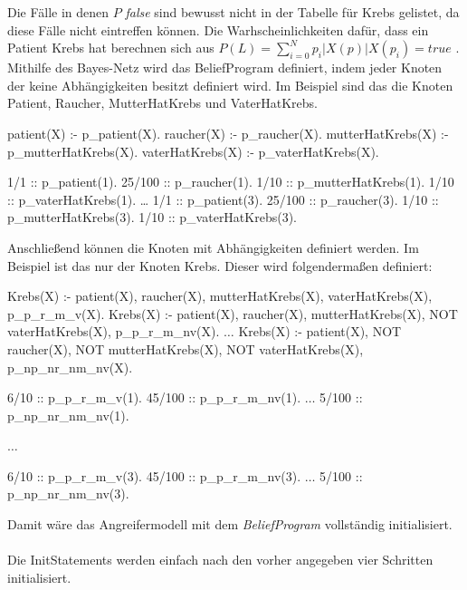 \documentclass[german,version-2020-11]{uzl-thesis}
\begin{document}
Die Fälle in denen $P$ \textit{false} sind bewusst nicht in der Tabelle für Krebs gelistet, da diese Fälle nicht eintreffen können. Die Warhscheinlichkeiten dafür, dass ein Patient Krebs hat berechnen sich aus $P(L) =\sum_{i=0}^N p_i | X(p) | X(p_i) = true$ . \\ 
Mithilfe des Bayes-Netz wird das BeliefProgram definiert, indem jeder Knoten der keine Abhängigkeiten besitzt definiert wird. Im Beispiel sind das die Knoten Patient, Raucher, MutterHatKrebs und VaterHatKrebs.
\begin{Pseudocode}[caption={Beispiel für Knoten ohne Abhängigkeiten }, label={lst-3}, numbers=left]
patient(X) :- p_patient(X).
raucher(X) :- p_raucher(X).
mutterHatKrebs(X) :- p_mutterHatKrebs(X).
vaterHatKrebs(X) :- p_vaterHatKrebs(X).
	
1/1 :: p_patient(1).
25/100 :: p_raucher(1).
1/10 :: p_mutterHatKrebs(1).
1/10 :: p_vaterHatKrebs(1).
\dots 
1/1 :: p_patient(3).
25/100 :: p_raucher(3).
1/10 :: p_mutterHatKrebs(3).
1/10 :: p_vaterHatKrebs(3).
\end{Pseudocode}
Anschließend können die Knoten mit Abhängigkeiten definiert werden. Im Beispiel ist das nur der Knoten Krebs. Dieser wird folgendermaßen definiert: 
\begin{Pseudocode}[caption={Beispiel für Knoten mit Abhängigkeiten }, label={lst-3}, numbers=left]
Krebs(X) :- patient(X), raucher(X), mutterHatKrebs(X), vaterHatKrebs(X), p_p_r_m_v(X).
Krebs(X) :- patient(X), raucher(X), mutterHatKrebs(X), NOT vaterHatKrebs(X), p_p_r_m_nv(X).
$\dots$
Krebs(X) :- patient(X), NOT raucher(X), NOT mutterHatKrebs(X), NOT vaterHatKrebs(X), p_np_nr_nm_nv(X).

6/10 :: p_p_r_m_v(1).
45/100 :: p_p_r_m_nv(1).
$\dots$
5/100 :: p_np_nr_nm_nv(1).

$\dots$

6/10 :: p_p_r_m_v(3).
45/100 :: p_p_r_m_nv(3).
$\dots$
5/100 :: p_np_nr_nm_nv(3).
\end{Pseudocode}
Damit wäre das Angreifermodell mit dem \textit{BeliefProgram} vollständig initialisiert.\\ \\
Die InitStatements werden einfach nach den vorher angegeben vier Schritten initialisiert.
\end{document}
